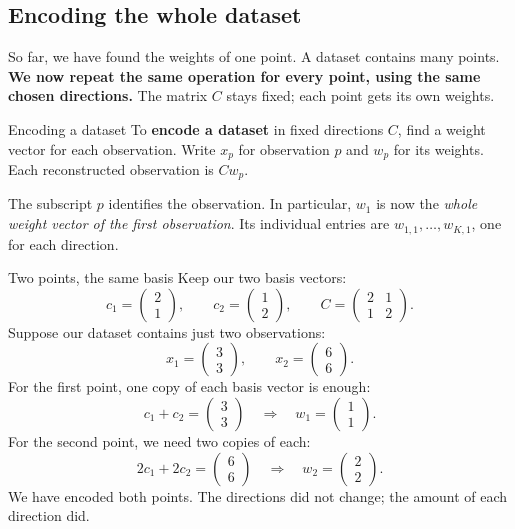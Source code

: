 \documentclass[a4paper,12pt,oneside]{report}
\begin{document}
\subsection{Encoding the whole dataset}

So far, we have found the weights of one point. A dataset contains
many points. \textbf{We now repeat the same operation for every point,
using the same chosen directions.}
The matrix $C$ stays fixed; each point gets its own weights.

\begin{frameddefn}{Encoding a dataset}
To \textbf{encode a dataset} in fixed directions $C$, find a weight
vector for each observation. Write $x_p$ for observation $p$ and
$w_p$ for its weights. Each reconstructed observation is $Cw_p$.

The subscript $p$ identifies the observation. In particular, $w_1$
is now the \emph{whole weight vector of the first observation}.
Its individual entries are $w_{1,1},\ldots,w_{K,1}$, one for each
direction.
\end{frameddefn}

\begin{framedexample}{Two points, the same basis}
Keep our two basis vectors:
\[
  c_1=\begin{pmatrix}2\\1\end{pmatrix},\qquad
  c_2=\begin{pmatrix}1\\2\end{pmatrix},\qquad
  C=\begin{pmatrix}2&1\\1&2\end{pmatrix}.
\]
Suppose our dataset contains just two observations:
\[
  x_1=\begin{pmatrix}3\\3\end{pmatrix},\qquad
  x_2=\begin{pmatrix}6\\6\end{pmatrix}.
\]
For the first point, one copy of each basis vector is enough:
\[
  c_1+c_2=\begin{pmatrix}3\\3\end{pmatrix}
  \quad\Longrightarrow\quad
  w_1=\begin{pmatrix}1\\1\end{pmatrix}.
\]
For the second point, we need two copies of each:
\[
  2c_1+2c_2=\begin{pmatrix}6\\6\end{pmatrix}
  \quad\Longrightarrow\quad
  w_2=\begin{pmatrix}2\\2\end{pmatrix}.
\]
We have encoded both points. The directions did not change; the
amount of each direction did.
\end{framedexample}
\end{document}
